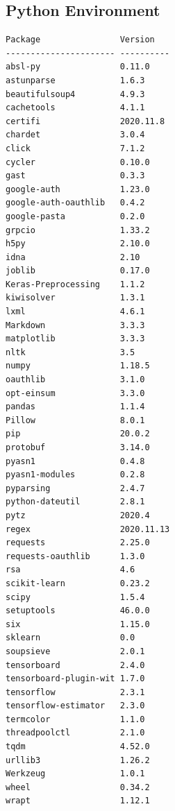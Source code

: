 \documentclass{csfourzero}
\begin{document}
\subsection{Python Environment}
\begin{verbatim}
Package                Version   
---------------------- ----------
absl-py                0.11.0    
astunparse             1.6.3     
beautifulsoup4         4.9.3     
cachetools             4.1.1     
certifi                2020.11.8 
chardet                3.0.4     
click                  7.1.2     
cycler                 0.10.0    
gast                   0.3.3     
google-auth            1.23.0    
google-auth-oauthlib   0.4.2     
google-pasta           0.2.0     
grpcio                 1.33.2    
h5py                   2.10.0    
idna                   2.10      
joblib                 0.17.0    
Keras-Preprocessing    1.1.2     
kiwisolver             1.3.1     
lxml                   4.6.1     
Markdown               3.3.3     
matplotlib             3.3.3     
nltk                   3.5       
numpy                  1.18.5    
oauthlib               3.1.0     
opt-einsum             3.3.0     
pandas                 1.1.4     
Pillow                 8.0.1     
pip                    20.0.2    
protobuf               3.14.0    
pyasn1                 0.4.8     
pyasn1-modules         0.2.8     
pyparsing              2.4.7     
python-dateutil        2.8.1     
pytz                   2020.4    
regex                  2020.11.13
requests               2.25.0    
requests-oauthlib      1.3.0     
rsa                    4.6       
scikit-learn           0.23.2    
scipy                  1.5.4     
setuptools             46.0.0    
six                    1.15.0    
sklearn                0.0       
soupsieve              2.0.1     
tensorboard            2.4.0     
tensorboard-plugin-wit 1.7.0     
tensorflow             2.3.1     
tensorflow-estimator   2.3.0     
termcolor              1.1.0     
threadpoolctl          2.1.0     
tqdm                   4.52.0    
urllib3                1.26.2    
Werkzeug               1.0.1     
wheel                  0.34.2    
wrapt                  1.12.1    
\end{verbatim}
\end{document}

